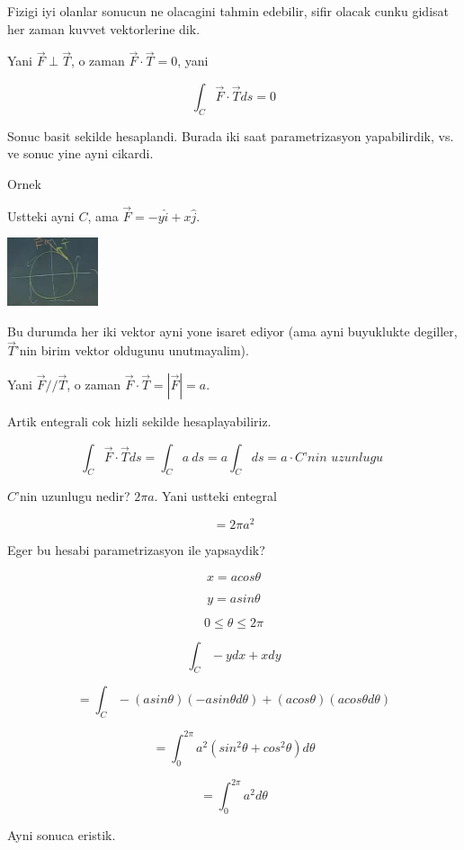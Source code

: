 \documentclass[12pt,fleqn]{article}
\begin{document}
Fizigi iyi olanlar sonucun ne olacagini tahmin edebilir, sifir olacak cunku
gidisat her zaman kuvvet vektorlerine dik. 

Yani $\vec{F} \perp \vec{T}$, o zaman $\vec{F} \cdot \vec{T} = 0$, yani

\[  \int_C \vec{F} \cdot \vec{T} ds = 0\]

Sonuc basit sekilde hesaplandi. Burada iki saat parametrizasyon
yapabilirdik, vs. ve sonuc yine ayni cikardi. 

Ornek

Ustteki ayni $C$, ama $\vec{F} = -y\hat{i} + x\hat{j}$. 

\includegraphics[height=2cm]{19_14.png}

Bu durumda her iki vektor ayni yone isaret ediyor (ama ayni buyuklukte
degiller, $\vec{T}$'nin birim vektor oldugunu unutmayalim). 

Yani $\vec{F} // \vec{T}$, o zaman $\vec{F} \cdot \vec{T} = |\vec{F}| =
a$.

Artik entegrali cok hizli sekilde hesaplayabiliriz. 

\[  \int_C \vec{F} \cdot \vec{T} ds 
=  \int_C a \ ds 
= a  \int_C ds 
= a \cdot C \textit{'nin uzunlugu }
\]

$C$'nin uzunlugu nedir? $2\pi a$. Yani ustteki entegral

\[ = 2\pi a^2 \]

Eger bu hesabi parametrizasyon ile yapsaydik? 

\[ x = acos\theta \]

\[ y = asin\theta \]

\[ 0 \le \theta \le 2\pi \]

\[ \int_C -y dx + x dy \]


\[ = \int_C -(asin\theta)(-asin\theta d\theta) + 
(acos\theta)(a cos\theta d\theta)
\]

\[ = \int_0^{2\pi} a^2 (sin^2\theta + cos^2\theta)d\theta \]

\[ = \int_0^{2\pi} a^2 d\theta \]

Ayni sonuca eristik. 
\end{document}
